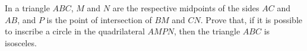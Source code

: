 In a triangle $ABC$,  $M$ and $N$ are the respective midpoints of the sides $AC$ and $AB$,  and $P$ is the point of intersection of $BM$ and $CN$. Prove that, if it is possible to inscribe a circle in the quadrilateral $AMPN$,  then the triangle $ABC$ is isosceles.